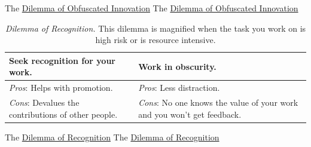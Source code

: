 The \href{table:innovate-open-obscure}{Dilemma of Obfuscated Innovation}
The \href{table:innovate-open-obscure}{Dilemma of Obfuscated Innovation}


\begin{center}
\begin{table}[H] %
\begin{tabular}{ | m{\dilemmatablewidth}| m{\dilemmatablewidth} | } 
  \hline
  \textbf{Seek recognition for your work.} &
  \textbf{Work in obscurity.} \\
  \hline
  \textit{Pros}: Helps with promotion. & 
  \textit{Pros}: Less distraction. \\
  \hline
  \textit{Cons}: Devalues the contributions of other people. & 
  \textit{Cons}: No one knows the value of your work and you won't get feedback. \\
  \hline
\end{tabular}
\caption{
\textit{Dilemma of Recognition.}
This dilemma is magnified when the task you work on is high risk or is resource intensive. 
}
\label{table:recognition-obscurity}
\end{table}
\end{center}

The \href{table:recognition-obscurity}{Dilemma of Recognition}
The \href{table:recognition-obscurity}{Dilemma of Recognition}


